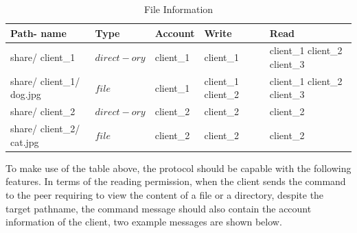 \documentclass[a4paper,10pt,titlepage,twocolumn]{article}
\begin{document}
    \begin{table}[h]
        \begin{center}
            \begin{tabular}{|p{1.15cm}|p{1.15cm}|p{1.15cm}|p{1.15cm}|p{1.15cm}|}
                \hline
                Path- name & Type & Account & Write & Read \\ \hline
                share/ client\_1&$direct- ory$&client\_1&client\_1 &client\_1 client\_2 client\_3 \\ \hline
                share/ client\_1/ dog.jpg & $file$&client\_1&client\_1 client\_2 &client\_1 client\_2 client\_3 \\ \hline 
                share/ client\_2& $direct- ory$ &client\_2&client\_2&client\_2 \\ \hline
                share/ client\_2/ cat.jpg & $file$ &client\_2&client\_2&client\_2 \\ \hline
            \end{tabular}
            \caption{File Information}\label{table_1}
        \end{center}
    \end{table}
    
To make use of the table above, the protocol should be capable with the following features. In terms of the reading permission, when the client sends the command to the peer requiring to view the content of a file or a directory, despite the target pathname, the command message should also contain the account information of the client, two example messages are shown below. 
    
\end{document}
